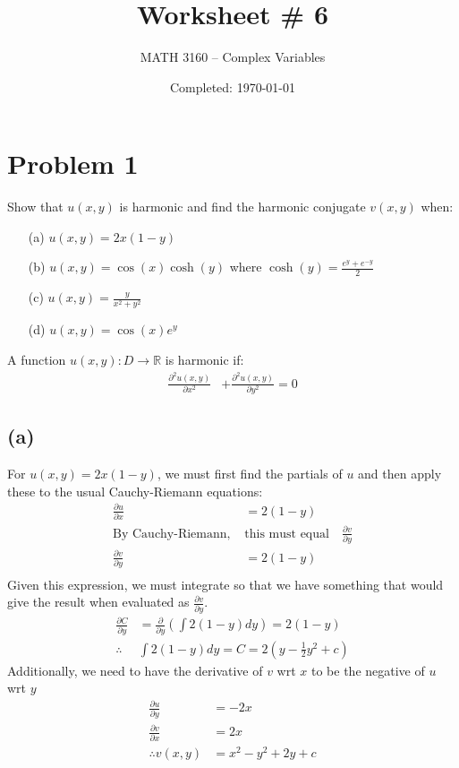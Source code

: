 \documentclass{article}
\title{Worksheet \# 6}
\author{
  MATH 3160 -- Complex Variables\\
  \myauthor
}
\date{Completed: \today}
\let\oldcos\cos
\let\oldcosh\cosh
\renewcommand{\cos}[1]{\oldcos\left(#1\right)}
\renewcommand{\cosh}[1]{\oldcosh\left(#1\right)}
\newcommand{\parder}[2]{\frac{\partial#1}{\partial#2}}
\newcommand{\secparder}[2]{\frac{\partial^2#1}{\partial#2^2}}
\begin{document}
\maketitle %


\section*{Problem 1}
Show that $u(x,y)$ is harmonic and find the harmonic conjugate $v(x,y)$ when:
\begin{enumerate}
  \item[(a)] $u(x,y) = 2x(1-y)$
  \item[(b)] $u(x,y) = \cos{x}\cosh{y}$ where $\cosh{y}=\frac{e^y+e^{-y}}{2}$
  \item[(c)] $u(x,y) = \frac{y}{x^2+y^2}$
  \item[(d)] $u(x,y) = \cos{x}e^y$
\end{enumerate}

A function $u(x,y):D\to\mathbb{R}$ is harmonic if:
\begin{align*}
\secparder{u(x,y)}{x} &+ \secparder{u(x,y)}{y} = 0
\end{align*}
\subsection*{(a)}
For $u(x,y) = 2x(1-y)$, we must first find the partials of $u$ and then apply these to the usual Cauchy-Riemann equations:
\begin{align*}
  \parder{u}{x} &= 2(1-y)\\
  \text{By Cauchy-Riemann, }&\text{this must equal} \quad \parder{v}{y} \\
  \parder{v}{y} &= 2(1-y)\\
\end{align*}
Given this expression, we must integrate so that we have something that would give the result when evaluated as $\parder{v}{y}$.
\begin{align*}
  \parder{C}{y} &= \parder{}{y}\left(\int 2(1-y)dy\right) = 2(1-y)\\
  \therefore &\int 2(1-y)dy = C = 2\left(y-\frac{1}{2}y^2 + c\right)
\end{align*}
Additionally, we need to have the derivative of $v$ wrt $x$ to be the negative of $u$ wrt $y$
\begin{align*}
    \parder{u}{y} &= -2x\\
  \parder{v}{x} &= 2x\\
  \therefore  v(x,y) &= x^2-y^2 + 2y + c
\end{align*}
\end{document}
